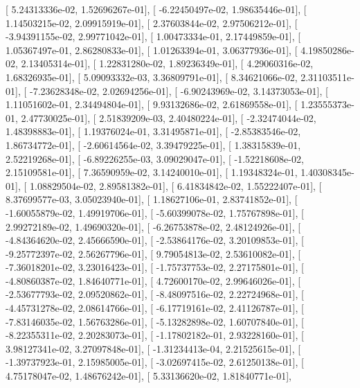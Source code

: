 \documentclass{article}
\begin{document}
       [  5.24313336e-02,   1.52696267e-01],
       [ -6.22450497e-02,   1.98635446e-01],
       [  1.14503215e-02,   2.09915919e-01],
       [  2.37603844e-02,   2.97506212e-01],
       [ -3.94391155e-02,   2.99771042e-01],
       [  1.00473334e-01,   2.17449859e-01],
       [  1.05367497e-01,   2.86280833e-01],
       [  1.01263394e-01,   3.06377936e-01],
       [  4.19850286e-02,   2.13405314e-01],
       [  1.22831280e-02,   1.89236349e-01],
       [  4.29060316e-02,   1.68326935e-01],
       [  5.09093332e-03,   3.36809791e-01],
       [  8.34621066e-02,   2.31103511e-01],
       [ -7.23628348e-02,   2.02694256e-01],
       [ -6.90243969e-02,   3.14373053e-01],
       [  1.11051602e-01,   2.34494804e-01],
       [  9.93132686e-02,   2.61869558e-01],
       [  1.23555373e-01,   2.47730025e-01],
       [  2.51839209e-03,   2.40480224e-01],
       [ -2.32474044e-02,   1.48398883e-01],
       [  1.19376024e-01,   3.31495871e-01],
       [ -2.85383546e-02,   1.86734772e-01],
       [ -2.60614564e-02,   3.39479225e-01],
       [  1.38315839e-01,   2.52219268e-01],
       [ -6.89226255e-03,   3.09029047e-01],
       [ -1.52218608e-02,   2.15109581e-01],
       [  7.36590959e-02,   3.14240010e-01],
       [  1.19348324e-01,   1.40308345e-01],
       [  1.08829504e-02,   2.89581382e-01],
       [  6.41834842e-02,   1.55222407e-01],
       [  8.37699577e-03,   3.05023940e-01],
       [  1.18627106e-01,   2.83741852e-01],
       [ -1.60055879e-02,   1.49919706e-01],
       [ -5.60399078e-02,   1.75767898e-01],
       [  2.99272189e-02,   1.49690320e-01],
       [ -6.26753878e-02,   2.48124926e-01],
       [ -4.84364620e-02,   2.45666590e-01],
       [ -2.53864176e-02,   3.20109853e-01],
       [ -9.25772397e-02,   2.56267796e-01],
       [  9.79054813e-02,   2.53610082e-01],
       [ -7.36018201e-02,   3.23016423e-01],
       [ -1.75737753e-02,   2.27175801e-01],
       [ -4.80860387e-02,   1.84640771e-01],
       [  4.72600170e-02,   2.99646026e-01],
       [ -2.53677793e-02,   2.09520862e-01],
       [ -8.48097516e-02,   2.22724968e-01],
       [ -4.45731278e-02,   2.08614766e-01],
       [ -6.17719161e-02,   2.41126787e-01],
       [ -7.83146035e-02,   1.56763286e-01],
       [ -5.13282898e-02,   1.60707840e-01],
       [ -8.22355311e-02,   2.20283073e-01],
       [ -1.17802182e-01,   2.93228160e-01],
       [  3.98127341e-02,   3.27097848e-01],
       [ -1.31234413e-04,   2.21525615e-01],
       [ -1.39737923e-01,   2.15985005e-01],
       [ -3.02697415e-02,   2.61250138e-01],
       [  4.75178047e-02,   1.48676242e-01],
       [  5.33136620e-02,   1.81840771e-01],
\end{document}
